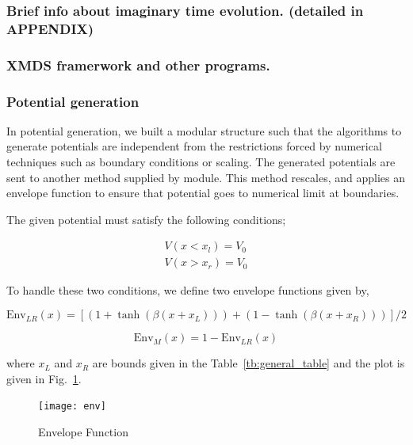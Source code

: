 \documentclass[a4paper,times,hidelinks,12pt]{article}
\begin{document}
\subsubsection{Brief info about imaginary time evolution. (detailed in APPENDIX)}
\subsubsection{XMDS framerwork and other programs.}
\subsubsection{Potential generation} \label{sec:potential_generation}

In potential generation, we built a modular structure such that the algorithms to generate potentials are independent from the restrictions forced by numerical techniques such as boundary conditions or scaling. The generated potentials are sent to another method supplied by module. This method rescales, and applies an envelope function to ensure that potential goes to numerical limit at boundaries. 

The given potential must satisfy the following conditions;

\begin{equation}
\label{eq:potential_boundary_conditions}
\begin{split}
    V(x < x_l) = V_0 \\ 
    V(x > x_r) = V_0
\end{split}
\end{equation}

To handle these two conditions, we define two envelope functions given by, 

\begin{equation}
\label{eq:envelope_potential_lr}
    \text{Env}_{LR}(x) = [(1 + \tanh{(\beta(x + x_L))}) + (1 - \tanh{(\beta(x + x_R))})]/2
\end{equation}

\begin{equation}
\label{eq:envelope_potential_m}
    \text{Env}_{M}(x) = 1 - \text{Env}_{LR}(x)
\end{equation}

where $x_L$ and $x_R$ are bounds given in the Table~\eqref{tb:general_table} and the plot is given in Fig.~\ref{fig:envelope_and_random_withot_pros}.  

\graphicspath{{"../figs/potentials/"}}
\begin{figure}[H]
\centering
\texttt{[image: env]}
\caption{Envelope Function}
\label{fig:envelope_and_random_withot_pros}
\end{figure}
\end{document}
